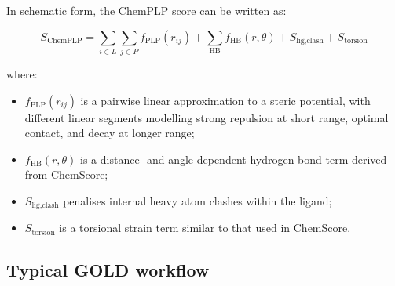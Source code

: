 \documentclass[12pt]{article}
\begin{document}
In schematic form, the ChemPLP score can be written as:

\begin{equation}
S_{\textrm{ChemPLP}}
=
\sum_{i \in L}\sum_{j \in P}
f_{\textrm{PLP}}(r_{ij})
+
\sum_{\textrm{HB}}
f_{\textrm{HB}}(r,\theta)
+
S_{\textrm{lig,clash}}
+
S_{\textrm{torsion}}
\label{eq:ChemPLP}
\end{equation}

where:
\begin{itemize}
    \item $f_{\textrm{PLP}}(r_{ij})$ is a pairwise linear approximation to a steric potential, with different linear segments modelling strong repulsion at short range, optimal contact, and decay at longer range;
    \item $f_{\textrm{HB}}(r,\theta)$ is a distance- and angle-dependent hydrogen bond term derived from ChemScore;
    \item $S_{\textrm{lig,clash}}$ penalises internal heavy atom clashes within the ligand;
    \item $S_{\textrm{torsion}}$ is a torsional strain term similar to that used in ChemScore.
\end{itemize}


\subsection{Typical GOLD workflow}
\end{document}
